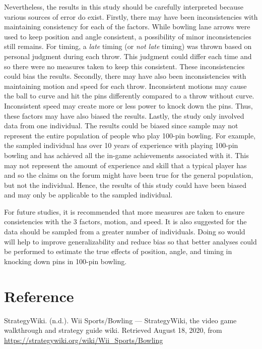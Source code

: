 \documentclass[
]{article}
\begin{document}
Nevertheless, the results in this study should be carefully interpreted because various sources of error do exist. Firstly, there may have been inconsistencies with maintaining consistency for each of the factors. While bowling lane arrows were used to keep position and angle consistent, a possibility of minor inconsistencies still remains. For timing, a \emph{late} timing (or \emph{not late} timing) was thrown based on personal judgment during each throw. This judgment could differ each time and so there were no measures taken to keep this consistent. These inconsistencies could bias the results. Secondly, there may have also been inconsistencies with maintaining motion and speed for each throw. Inconsistent motions may cause the ball to curve and hit the pins differently compared to a throw without curve. Inconsistent speed may create more or less power to knock down the pins. Thus, these factors may have also biased the results. Lastly, the study only involved data from one individual. The results could be biased since sample may not represent the entire population of people who play 100-pin bowling. For example, the sampled individual has over 10 years of experience with playing 100-pin bowling and has achieved all the in-game achievements associated with it. This may not represent the amount of experience and skill that a typical player has and so the claims on the forum might have been true for the general population, but not the individual. Hence, the results of this study could have been biased and may only be applicable to the sampled individual.

For future studies, it is recommended that more measures are taken to ensure consistencies with the 3 factors, motion, and speed. It is also suggested for the data should be sampled from a greater number of individuals. Doing so would will help to improve generalizability and reduce bias so that better analyses could be performed to estimate the true effects of position, angle, and timing in knocking down pins in 100-pin bowling.

\hypertarget{reference}{%
\section{Reference}\label{reference}}

StrategyWiki. (n.d.). Wii Sports/Bowling --- StrategyWiki, the video game walkthrough and strategy guide wiki. Retrieved August 18, 2020, from \url{https://strategywiki.org/wiki/Wii_Sports/Bowling}
\end{document}
